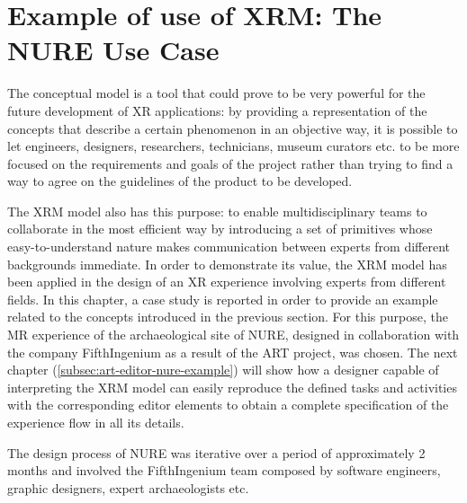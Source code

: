 \section{Example of use of XRM: The NURE Use Case}
\label{sec:conceptual-nure-example}

The conceptual model is a tool that could prove to be very powerful for the future development of XR applications: by providing a representation of the concepts that describe a certain phenomenon in an objective way, it is possible to let engineers, designers, researchers, technicians, museum curators etc. to be more focused on the requirements and goals of the project rather than trying to find a way to agree on the guidelines of the product to be developed. 

The XRM model also has this purpose: to enable multidisciplinary teams to collaborate in the most efficient way by introducing a set of primitives whose easy-to-understand nature makes communication between experts from different backgrounds immediate. In order to demonstrate its value, the XRM model has been applied in the design of an XR experience involving experts from different fields.
In this chapter, a case study is reported in order to provide an example related to the concepts introduced in the previous section. For this purpose, the MR experience of the archaeological site of NURE, designed in collaboration with the company FifthIngenium as a result of the ART project, was chosen. 
The next chapter (\autoref{subsec:art-editor-nure-example}) will show how a designer capable of interpreting the XRM model can easily reproduce the defined tasks and activities with the corresponding editor elements to obtain a complete specification of the experience flow in all its details.

The design process of NURE was iterative over a period of approximately 2 months and involved the FifthIngenium team composed by software engineers, graphic designers, expert archaeologists etc.

